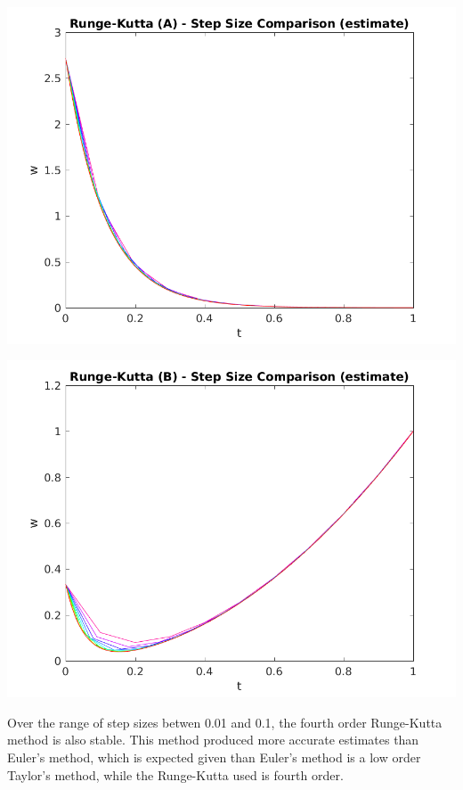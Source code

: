 \documentclass{article}
\begin{document}
\begin{center}
	\centering
    \begin{minipage}{0.5\textwidth}
        \centering
	    \includegraphics[width=1\textwidth]{../output/a_rk_h_val.png}
    \end{minipage}\hfill
    \begin{minipage}{0.5\textwidth}
        \centering
	    \includegraphics[width=1\textwidth]{../output/b_rk_h_val.png}
    \end{minipage}
 	\label{fig:rk_h_val}
\end{center}

Over the range of step sizes betwen 0.01 and 0.1, the fourth order Runge-Kutta method is also stable. This method produced more accurate estimates than Euler's method, which is expected given than Euler's method is a low order Taylor's method, while the Runge-Kutta used is fourth order.
\end{document}
